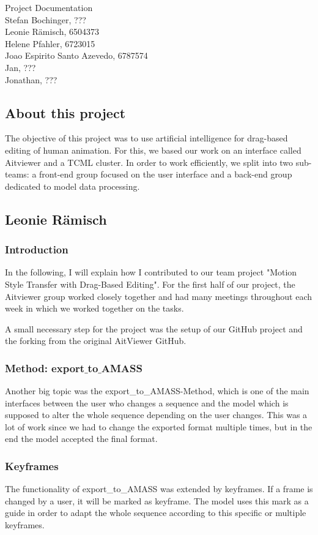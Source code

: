 \documentclass[a4paper]{scrartcl}
\def\header#1#2{
  \begin{center}
    {\Large Project Documentation}\\
    {Stefan Bochinger, ???}\\
    {Leonie Rämisch, 6504373}\\
    {Helene Pfahler, 6723015}\\
    {Joao Espirito Santo Azevedo, 6787574}\\
    {Jan, ???}\\
    {Jonathan, ???}
  \end{center}
}
\begin{document}
\header{Nr. \NUMBER}{\DEADLINE}

\subsection*{About this project}
The objective of this project was to use artificial intelligence for drag-based editing of human animation. For this, we based our work on an interface called Aitviewer and a TCML cluster. 
In order to work efficiently, we split into two sub-teams: a front-end group focused on the user interface and a back-end group dedicated to model data processing.  


\subsection*{Leonie Rämisch}
\subsubsection*{Introduction}
In the following, I will explain how I contributed to our team project "Motion Style Transfer with Drag-Based Editing". For the first half of our project, the Aitviewer group worked closely together and had many meetings throughout each week in which we worked together on the tasks. 

A small necessary step for the project was the setup of our GitHub project and the forking from the original AitViewer GitHub.

\subsubsection*{Method: export$\_$to$\_$AMASS}
Another big topic was the export\_to\_AMASS-Method, which is one of the main interfaces between the user who changes a sequence and the model which is supposed to alter the whole sequence depending on the user changes. This was a lot of work since we had to change the exported format multiple times, but in the end the model accepted the final format.

\subsubsection*{Keyframes}
The functionality of export\_to\_AMASS was extended by keyframes. If a frame is changed by a user, it will be marked as keyframe. The model uses this mark as a guide in order to adapt the whole sequence according to this specific or multiple keyframes.
\end{document}
